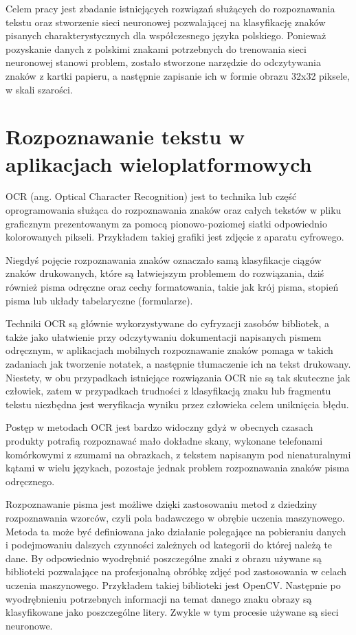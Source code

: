 \documentclass[brudnopis]{xmgr}
\begin{document}
  Celem pracy jest  zbadanie istniejących rozwiązań służących do rozpoznawania tekstu oraz stworzenie sieci neuronowej pozwalającej na klasyfikację znaków pisanych charakterystycznych dla współczesnego języka polskiego. Ponieważ pozyskanie danych z polskimi znakami potrzebnych do trenowania sieci neuronowej stanowi problem, zostało stworzone narzędzie do odczytywania znaków z kartki papieru, a następnie zapisanie ich w formie obrazu 32x32 piksele, w skali szarości.

\chapter{Rozpoznawanie tekstu w aplikacjach wieloplatformowych}

OCR (ang. Optical Character Recognition) jest to technika lub część oprogramowania służąca do rozpoznawania znaków oraz całych tekstów w pliku graficznym prezentowanym za pomocą pionowo-poziomej siatki odpowiednio kolorowanych pikseli. Przykładem takiej grafiki jest zdjęcie z aparatu cyfrowego. 

Niegdyś pojęcie rozpoznawania znaków oznaczało samą klasyfikacje ciągów znaków drukowanych, które są łatwiejszym problemem do rozwiązania, dziś również pisma odręczne oraz cechy formatowania, takie jak krój pisma, stopień pisma lub układy tabelaryczne (formularze).

Techniki OCR są głównie wykorzystywane do cyfryzacji zasobów bibliotek, a także jako ułatwienie przy odczytywaniu dokumentacji napisanych pismem odręcznym, w aplikacjach mobilnych rozpoznawanie znaków pomaga w takich zadaniach jak tworzenie notatek, a następnie tłumaczenie ich na tekst drukowany. Niestety, w obu przypadkach istniejące rozwiązania OCR nie są tak skuteczne jak człowiek, zatem w przypadkach trudności z klasyfikacją znaku lub fragmentu tekstu niezbędna jest weryfikacja wyniku przez człowieka celem uniknięcia błędu.

Postęp w metodach OCR jest bardzo widoczny gdyż w obecnych czasach produkty potrafią rozpoznawać mało dokładne skany, wykonane telefonami komórkowymi z szumami na obrazkach, z tekstem napisanym pod nienaturalnymi kątami w wielu językach, pozostaje jednak problem rozpoznawania znaków pisma odręcznego.

Rozpoznawanie pisma jest możliwe dzięki zastosowaniu metod z dziedziny rozpoznawania wzorców, czyli pola badawczego w obrębie uczenia maszynowego. Metoda ta może być definiowana jako działanie polegające na pobieraniu danych i podejmowaniu dalszych czynności zależnych od kategorii do której należą te dane. By odpowiednio wyodrębnić poszczególne znaki z obrazu używane są biblioteki pozwalające na profesjonalną obróbkę zdjęć pod zastosowania w celach uczenia maszynowego. Przykładem takiej biblioteki jest OpenCV. Następnie po wyodrębnieniu potrzebnych informacji na temat danego znaku obrazy są klasyfikowane jako poszczególne litery. Zwykle w tym procesie używane są sieci neuronowe.
\end{document}
